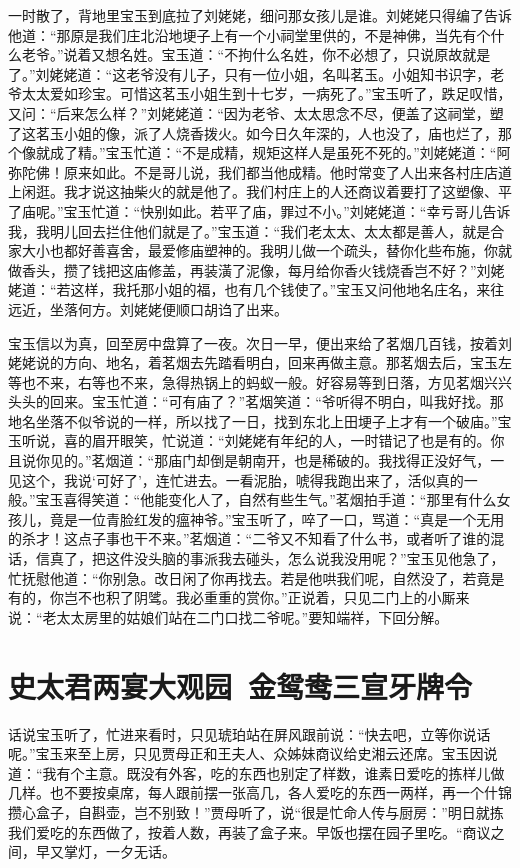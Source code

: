 \documentclass[12pt,oneside]{book}
\begin{document}
一时散了，背地里宝玉到底拉了刘姥姥，细问那女孩儿是谁。刘姥姥只得编了告诉他道：“那原是我们庄北沿地埂子上有一个小祠堂里供的，不是神佛，当先有个什么老爷。”说着又想名姓。宝玉道：“不拘什么名姓，你不必想了，只说原故就是了。”刘姥姥道：“这老爷没有儿子，只有一位小姐，名叫茗玉。小姐知书识字，老爷太太爱如珍宝。可惜这茗玉小姐生到十七岁，一病死了。”宝玉听了，跌足叹惜，又问：“后来怎么样？”刘姥姥道：“因为老爷、太太思念不尽，便盖了这祠堂，塑了这茗玉小姐的像，派了人烧香拨火。如今日久年深的，人也没了，庙也烂了，那个像就成了精。”宝玉忙道：“不是成精，规矩这样人是虽死不死的。”刘姥姥道：“阿弥陀佛！原来如此。不是哥儿说，我们都当他成精。他时常变了人出来各村庄店道上闲逛。我才说这抽柴火的就是他了。我们村庄上的人还商议着要打了这塑像、平了庙呢。”宝玉忙道：“快别如此。若平了庙，罪过不小。”刘姥姥道：“幸亏哥儿告诉我，我明儿回去拦住他们就是了。”宝玉道：“我们老太太、太太都是善人，就是合家大小也都好善喜舍，最爱修庙塑神的。我明儿做一个疏头，替你化些布施，你就做香头，攒了钱把这庙修盖，再装潢了泥像，每月给你香火钱烧香岂不好？”刘姥姥道：“若这样，我托那小姐的福，也有几个钱使了。”宝玉又问他地名庄名，来往远近，坐落何方。刘姥姥便顺口胡诌了出来。

宝玉信以为真，回至房中盘算了一夜。次日一早，便出来给了茗烟几百钱，按着刘姥姥说的方向、地名，着茗烟去先踏看明白，回来再做主意。那茗烟去后，宝玉左等也不来，右等也不来，急得热锅上的蚂蚁一般。好容易等到日落，方见茗烟兴兴头头的回来。宝玉忙道：“可有庙了？”茗烟笑道：“爷听得不明白，叫我好找。那地名坐落不似爷说的一样，所以找了一日，找到东北上田埂子上才有一个破庙。”宝玉听说，喜的眉开眼笑，忙说道：“刘姥姥有年纪的人，一时错记了也是有的。你且说你见的。”茗烟道：“那庙门却倒是朝南开，也是稀破的。我找得正没好气，一见这个，我说‘可好了’，连忙进去。一看泥胎，唬得我跑出来了，活似真的一般。”宝玉喜得笑道：“他能变化人了，自然有些生气。”茗烟拍手道：“那里有什么女孩儿，竟是一位青脸红发的瘟神爷。”宝玉听了，啐了一口，骂道：“真是一个无用的杀才！这点子事也干不来。”茗烟道：“二爷又不知看了什么书，或者听了谁的混话，信真了，把这件没头脑的事派我去碰头，怎么说我没用呢？”宝玉见他急了，忙抚慰他道：“你别急。改日闲了你再找去。若是他哄我们呢，自然没了，若竟是有的，你岂不也积了阴骘。我必重重的赏你。”正说着，只见二门上的小厮来说：“老太太房里的姑娘们站在二门口找二爷呢。”要知端祥，下回分解。
 
 
\chapter{史太君两宴大观园~金鸳鸯三宣牙牌令}
话说宝玉听了，忙进来看时，只见琥珀站在屏风跟前说：“快去吧，立等你说话呢。”宝玉来至上房，只见贾母正和王夫人、众姊妹商议给史湘云还席。宝玉因说道：“我有个主意。既没有外客，吃的东西也别定了样数，谁素日爱吃的拣样儿做几样。也不要按桌席，每人跟前摆一张高几，各人爱吃的东西一两样，再一个什锦攒心盒子，自斟壶，岂不别致！”贾母听了，说“很是忙命人传与厨房：”明日就拣我们爱吃的东西做了，按着人数，再装了盒子来。早饭也摆在园子里吃。“商议之间，早又掌灯，一夕无话。
\end{document}

